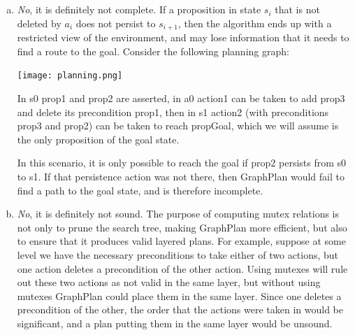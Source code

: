 \documentclass{article}
\begin{document}
\section{}
\begin{enumerate}[(a)]
\item
\emph{No}, it is definitely not complete. If a proposition in state
$s_i$ that is not deleted by $a_i$ does not persist to $s_{i+1}$, then the
algorithm ends up with a restricted view of the environment, and may lose
information that it needs to find a route to the goal. Consider the following
planning graph:

\begin{center}

\texttt{[image: planning.png]}

\end{center}

In s0 prop1 and prop2 are asserted, in a0 action1 can be taken to add 
prop3 and delete its precondition prop1, then in s1 action2
(with preconditions prop3 and prop2) can be taken to reach propGoal, which we
will assume is the only proposition of the goal state.

\vspace{1em}

In this scenario, it is only possible to reach the goal if prop2 persists from
s0 to s1. If that persistence action was not there, then GraphPlan would
fail to find a path to the goal state, and is therefore incomplete.

\item
\emph{No}, it is definitely not sound. The purpose of computing mutex
relations is not only to prune the search tree, making GraphPlan
more efficient, but also to ensure that it produces valid layered plans. For
example, suppose at some level we have the necessary preconditions to take
either of two actions, but one action deletes
a precondition of the other action. Using mutexes will rule out these two
actions as not valid in the same layer, but without using mutexes GraphPlan
could place them in the same layer. Since one deletes a precondition of the
other, the order that the actions were taken in would be significant, and a plan
putting them in the same layer would be unsound.

\end{enumerate}

\newpage
\end{document}
